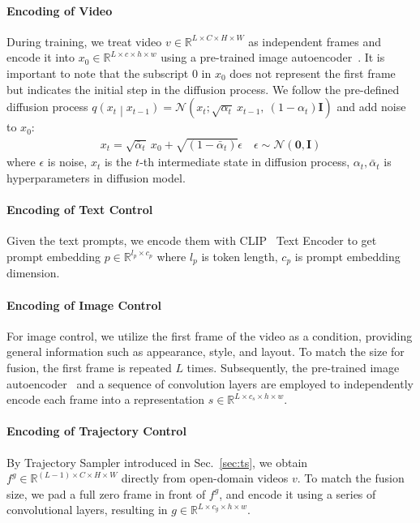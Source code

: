 \documentclass{article} %
\begin{document}
\paragraph{Encoding of Video}
During training, we treat video $v\in\mathbb{R}^{L\times C\times H \times W}$ as independent frames and encode it into $x_0\in \mathbb{R}^{L\times c\times h\times w}$ using a pre-trained image autoencoder~\citet{rombachHighResolutionImageSynthesis2022}. It is important to note that the subscript 0 in $x_0$ does not represent the first frame  but indicates the initial step in the diffusion process. We follow the pre-defined diffusion process $q\left(x_t\middle| x_{t-1}\right)=\mathcal{N}\left(x_t;\sqrt{\alpha_t}\ x_{t-1},\ \left(1-\alpha_t\right)\mathbf{I}\right) $  and add noise to $x_0$:
\begin{align}
    x_t=\sqrt{{\bar{\alpha}}_t}\ x_0+\sqrt{(1-{\bar{\alpha}}_t)}\epsilon\quad \epsilon\sim\mathcal{N}(\mathbf{0},\mathbf{I})
\end{align}
where $\epsilon$ is noise, $x_t$ is the $t$-th intermediate state in diffusion process, $\alpha_t, {\bar{\alpha}}_t$ is hyperparameters in diffusion model. 


\paragraph{Encoding of Text Control}
Given the text prompts, we encode them with CLIP~\citet{radfordLearningTransferableVisual2021a} Text Encoder to get prompt embedding $p\in \mathbb{R}^{l_p\times c_p}$ where $l_p$ is token length, $c_p$ is prompt embedding dimension. 

\paragraph{Encoding of Image Control}
For image control, we utilize the first frame of the video as a condition, providing general information such as appearance, style, and layout. To match the size for fusion, the first frame is repeated $L$ times. Subsequently, the pre-trained image autoencoder~\citet{rombachHighResolutionImageSynthesis2022} and a sequence of convolution layers are employed to independently encode each frame into a representation $s \in \mathbb{R}^{L\times c_s\times h\times w}$.

\paragraph{Encoding of Trajectory Control}
By Trajectory Sampler introduced in Sec.~\ref{sec:ts}, we obtain $f^g\in\mathbb{R}^{(L-1)\times C\times H \times W}$ directly from open-domain videos $v$. To match the fusion size, we pad a full zero frame in front of $f^g$, and encode it using a series of convolutional layers, resulting in $g\in\mathbb{R}^{L\times c_g\times h \times w}$. 
\end{document}
